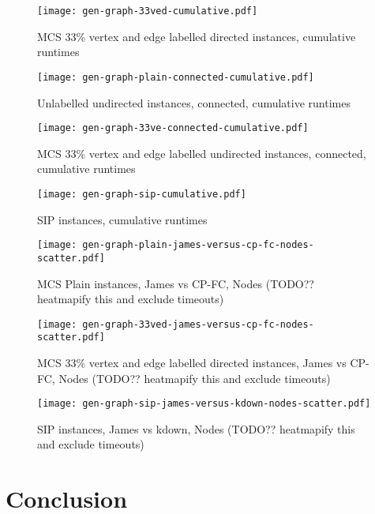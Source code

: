 \documentclass[letterpaper]{article}
\begin{document}
\begin{figure}
    \centering
    \texttt{[image: gen-graph-33ved-cumulative.pdf]}
    \caption{MCS 33\% vertex and edge labelled directed instances, cumulative runtimes}\label{figure:33ved-cumulative}
\end{figure}

\begin{figure}
    \centering
    \texttt{[image: gen-graph-plain-connected-cumulative.pdf]}
    \caption{Unlabelled undirected instances, connected, cumulative runtimes}\label{figure:plain-connected-cumulative}
\end{figure}

\begin{figure}
    \centering
    \texttt{[image: gen-graph-33ve-connected-cumulative.pdf]}
    \caption{MCS 33\% vertex and edge labelled undirected instances, connected, cumulative runtimes}\label{figure:33ve-connected-cumulative}
\end{figure}

\begin{figure}
    \centering
    \texttt{[image: gen-graph-sip-cumulative.pdf]}
    \caption{SIP instances, cumulative runtimes}\label{figure:sip-cumulative}
\end{figure}

\begin{figure}
    \centering
    \texttt{[image: gen-graph-plain-james-versus-cp-fc-nodes-scatter.pdf]}
    \caption{MCS Plain instances, James vs CP-FC, Nodes (TODO?? heatmapify this
    and exclude timeouts)}\label{figure:plain-james-versus-cp-fc-nodes-scatter}
\end{figure}

\begin{figure}
    \centering
    \texttt{[image: gen-graph-33ved-james-versus-cp-fc-nodes-scatter.pdf]}
    \caption{MCS 33\% vertex and edge labelled directed instances, James vs
    CP-FC, Nodes (TODO?? heatmapify this and exclude
    timeouts)}\label{figure:33ved-james-versus-cp-fc-nodes-scatter}
\end{figure}

\begin{figure}
    \centering
    \texttt{[image: gen-graph-sip-james-versus-kdown-nodes-scatter.pdf]}
    \caption{SIP instances, James vs kdown, Nodes (TODO?? heatmapify this and exclude
    timeouts)}\label{figure:sip-james-versus-kdown-nodes-scatter}
\end{figure}

\section{Conclusion}



\end{document}
